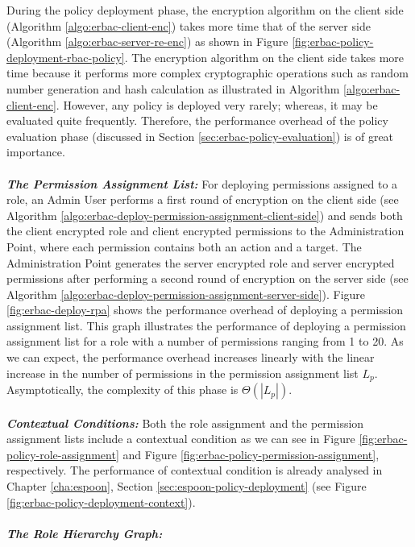 \documentclass[epsfig,a4paper,11pt,titlepage]{book}
\numberwithin{algorithm}{chapter}
\begin{document}
During the policy deployment phase, the encryption algorithm on the client side (Algorithm \ref{algo:erbac-client-enc}) takes more time that of the server side (Algorithm \ref{algo:erbac-server-re-enc}) as shown in Figure \ref{fig:erbac-policy-deployment-rbac-policy}. The encryption algorithm on the client side takes more time because it performs more complex cryptographic operations such as random number generation and hash calculation as illustrated in Algorithm \ref{algo:erbac-client-enc}. However, any policy is deployed very rarely; whereas, it may be evaluated quite frequently. Therefore, the performance overhead of the policy evaluation phase (discussed in Section \ref{sec:erbac-policy-evaluation}) is of great importance. \\ \\
\noindent \emph{\textbf{The Permission Assignment List:}} 
For deploying permissions assigned to a role, an Admin User performs a first round of encryption on the client side (see Algorithm \ref{algo:erbac-deploy-permission-assignment-client-side}) and sends both the client encrypted role and client encrypted permissions to the Administration Point, where each permission contains both an action and a target. The Administration Point generates the server encrypted role and server encrypted permissions after performing a second round of encryption on the server side (see Algorithm \ref{algo:erbac-deploy-permission-assignment-server-side}). Figure \ref{fig:erbac-deploy-rpa} shows the performance overhead of deploying a permission assignment list. This graph illustrates the performance of deploying a permission assignment list for a role with a number of permissions ranging from 1 to 20. As we can expect, the performance overhead increases linearly with the linear increase in the number of permissions in the permission assignment list $L_p$. Asymptotically, the complexity of this phase is ${\Theta}(| L_p |)$. \\ \\
\noindent \emph{\textbf{Contextual Conditions:}} 
Both the role assignment and the permission assignment lists include a contextual condition as we can see in Figure \ref{fig:erbac-policy-role-assignment} and Figure \ref{fig:erbac-policy-permission-assignment}, respectively. The performance of contextual condition is already analysed in Chapter \ref{cha:espoon}, Section \ref{sec:espoon-policy-deployment} (see Figure \ref{fig:erbac-policy-deployment-context}). \\ \\
\noindent \emph{\textbf{The Role Hierarchy Graph:}} 
\end{document}
